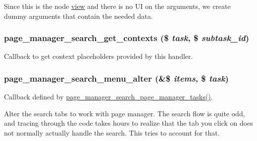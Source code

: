 Since this is the node \hyperlink{classview}{view} and there is no UI on the arguments, we create dummy arguments that contain the needed data. \hypertarget{search_8inc_abb94c14f90c4b6e7fe31c190fb101983}{
\subsubsection[{page\_\-manager\_\-search\_\-get\_\-contexts}]{\setlength{\rightskip}{0pt plus 5cm}page\_\-manager\_\-search\_\-get\_\-contexts (\$ {\em task}, \/  \$ {\em subtask\_\-id})}}
\label{search_8inc_abb94c14f90c4b6e7fe31c190fb101983}
Callback to get context placeholders provided by this handler. \hypertarget{search_8inc_a136ff5e3f4fd4aee819affbaf52f0423}{
\subsubsection[{page\_\-manager\_\-search\_\-menu\_\-alter}]{\setlength{\rightskip}{0pt plus 5cm}page\_\-manager\_\-search\_\-menu\_\-alter (\&\$ {\em items}, \/  \$ {\em task})}}
\label{search_8inc_a136ff5e3f4fd4aee819affbaf52f0423}
Callback defined by \hyperlink{search_8inc_ab3a19319349c19ffc47a5c86576efeee}{page\_\-manager\_\-search\_\-page\_\-manager\_\-tasks()}.

Alter the search tabs to work with page manager. The search flow is quite odd, and tracing through the code takes hours to realize that the tab you click on does not normally actually handle the search. This tries to account for that.

